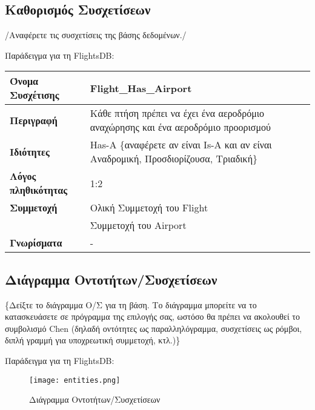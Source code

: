 \subsection{Καθορισμός Συσχετίσεων}

/{Αναφέρετε τις συσχετίσεις της βάσης δεδομένων./}

Παράδειγμα για τη FlightsDB:

\begin{tabular}[]{|p{4cm}|p{10cm}|}
  \hline
  \textbf{Όνομα Συσχέτισης} & Flight\_Has\_Airport \\ \hline
  \textbf{Περιγραφή} & Κάθε πτήση πρέπει να έχει ένα αεροδρόμιο
                       αναχώρησης και ένα αεροδρόμιο προορισμού \\ \hline
  \textbf{Ιδιότητες} & Has-A \{αναφέρετε αν είναι Is-A και αν είναι
                       Αναδρομική, Προσδιορίζουσα, Τριαδική\} \\ \hline
  \textbf{Λόγος πληθικότητας} & 1:2 \\ \hline
  \textbf{Συμμετοχή} & Ολική Συμμετοχή του Flight \\ \cline{2-2}
                            &Συμμετοχή του Airport \\ \hline
  \textbf{Γνωρίσματα} & - \\ \hline
\end{tabular}

\subsection{Διάγραμμα Οντοτήτων/Συσχετίσεων}

\{Δείξτε το διάγραμμα Ο/Σ για τη βάση. Το διάγραμμα μπορείτε να το
κατασκευάσετε σε πρόγραμμα της επιλογής σας, ωστόσο θα πρέπει να
ακολουθεί το συμβολισμό Chen (δηλαδή οντότητες ως παραλληλόγραμμα,
συσχετίσεις ως ρόμβοι, διπλή γραμμή για υποχρεωτική συμμετοχή, κτλ.)\}

Παράδειγμα για τη FlightsDB:
\begin{figure}[H]
  \centering
  \texttt{[image: entities.png]}
  \caption{Διάγραμμα Οντοτήτων/Συσχετίσεων}
\end{figure}


